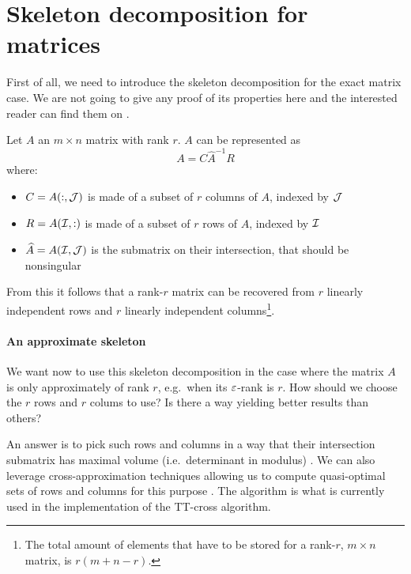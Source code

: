 \section{Skeleton decomposition for matrices}
First of all, we need to introduce the skeleton decomposition for the exact matrix case. We are not going to give any proof of its properties here and the interested reader can find them on \cite{goreinov1997theory,gantmacher1959matrix}.

\begin{Teo}
  Let $A$ an $m \times n$ matrix with rank $r$. $A$ can be represented as
  \begin{equation} \label{def:skeleton}
    A = C \hat{A}^{-1} R
  \end{equation}
  where:
  \begin{itemize}
  \item $C = A(:,\mathcal{J})$ is made of a subset of $r$ columns of $A$, indexed by $\mathcal{J}$
  \item $R = A(\mathcal{I},:)$ is made of a subset of $r$ rows of $A$, indexed by $\mathcal{I}$
  \item $\widehat{A} = A(\mathcal{I},\mathcal{J})$ is the submatrix on their intersection, that should be nonsingular
  \end{itemize}
\end{Teo}

From this it follows that a rank-$r$ matrix can be recovered from $r$ linearly independent rows and $r$ linearly independent columns\footnote{The total amount of elements that have to be stored for a rank-$r$, $m \times n$ matrix, is $r(m+n-r)$.}.

\paragraph{An approximate skeleton}
We want now to use this skeleton decomposition in the case where the matrix $A$ is only approximately of rank $r$, e.g.\ when its $\varepsilon$-rank is $r$.
How should we choose the $r$ rows and $r$ colums to use? Is there a way yielding better results than others?

An answer is to pick such rows and columns in a way that their intersection submatrix has maximal volume (i.e.\ determinant in modulus) \cite{goreinov2001maximal}. We can also leverage cross-approximation techniques allowing us to compute quasi-optimal sets of rows and columns for this purpose \cite{tyrtyshnikov2000incomplete,bebendorf2000approximation}. The  algorithm \cite{goreinov2010find} is what is currently used in the implementation of the TT-cross algorithm.

